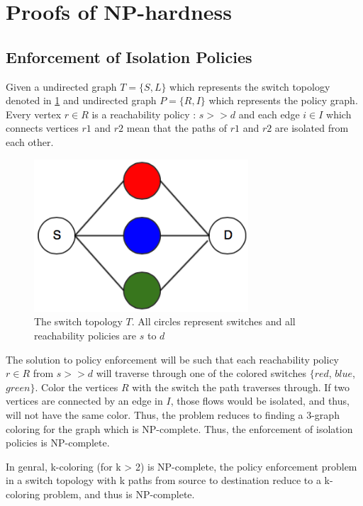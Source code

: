  \appendix
 \section{Proofs of NP-hardness} \label{sec:np}
 \subsection{Enforcement of Isolation Policies} \label{sec:isolationNP}
 Given a undirected graph $T=\{S,L\}$ which represents the switch topology denoted in \cref{fig:swtopo} and undirected graph $P =\{R,I\}$ which represents the policy graph. Every vertex $r \in R$ is a reachability policy : $s >> d$ and each edge $i \in I$ which connects vertices $r1$ and $r2$ mean that the paths of $r1$ and $r2$ are isolated from each other. 
 \begin{figure}[H] 
 	\includegraphics[width=8cm]{color_topo.png}
 	\caption{The switch topology $T$. All circles represent switches and all reachability policies are $s$ to $d$}
 	\label{fig:swtopo}
 \end{figure}
The solution to policy enforcement will be such that each reachability policy $r \in R$ from $s >> d$ will traverse through one of the colored switches $\{red$, $blue$, $green\}$. Color the vertices $R$ with the switch the path traverses through. If two vertices are connected by an edge in $I$, those flows would be isolated, and thus, will not have the same color. Thus, the problem reduces to finding a 3-graph coloring for the graph which is NP-complete. Thus, the enforcement of isolation policies is NP-complete. 
 
 In genral, k-coloring (for k > 2) is NP-complete, the policy enforcement problem in a switch topology with k paths from source to destination reduce to a k-coloring problem, and thus is NP-complete. 
 
